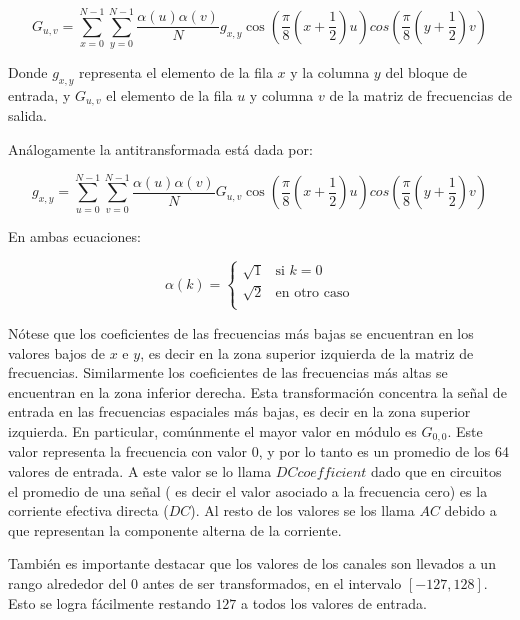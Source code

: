 \documentclass[%
	final,
	reprint,
	notitlepage,
	narroweqnarray,
	inline,
	twoside,
	invited
	]{ieee}
\begin{document}
\begin{equation}
	G_{u, v} = \sum^{N-1}_{x=0}\sum^{N-1}_{y=0}\frac{\alpha(u)\alpha(v)}{N}g_{x, y}\cos(\frac{\pi}{8}(x+\frac{1}{2})u)cos(\frac{\pi}{8}(y+\frac{1}{2})v)
\end{equation}

Donde $g_{x, y}$ representa el elemento de la fila $x$ y la columna $y$ del bloque de entrada, y $G_{u, v}$ 
el elemento de la fila $u$ y columna $v$ de la matriz de frecuencias de salida.

Análogamente la antitransformada está dada por:

\begin{equation}
	g_{x, y} = \sum^{N-1}_{u=0}\sum^{N-1}_{v=0}\frac{\alpha(u)\alpha(v)}{N}G_{u, v}\cos(\frac{\pi}{8}(x+\frac{1}{2})u)cos(\frac{\pi}{8}(y+\frac{1}{2})v)
\end{equation}

En ambas ecuaciones:

\begin{equation}
	\alpha(k) = \left \{
		\begin{array}{rl}
			\sqrt{1} & \mbox{si } k = 0 \\ 
			\sqrt{2} & \mbox{en otro caso} \\
		\end{array}
		\right.
\end{equation}

\par Nótese que los coeficientes de las frecuencias más bajas se encuentran en los valores bajos de $x$ e $y$, 
es decir en la zona superior 
izquierda de la matriz de frecuencias. Similarmente los coeficientes de las frecuencias más altas se encuentran 
en la zona inferior derecha. Esta transformación concentra la señal de entrada en las frecuencias espaciales más bajas, 
es decir en la zona superior izquierda. En particular, comúnmente el mayor valor en módulo es $G_{0,0}$. 
Este valor representa la frecuencia con valor 0, y por lo tanto es un promedio de los 64 valores de entrada. A este 
valor se lo llama $DC coefficient$ dado que en circuitos el promedio de una señal ( es decir el valor asociado 
a la frecuencia cero) es la corriente efectiva directa ($DC$). Al resto de los valores se los llama $AC$ debido 
a que representan la componente alterna de la corriente.

\par También es importante destacar que los valores de los canales son llevados a un rango 
alrededor del $0$ antes de ser transformados, en el intervalo $[-127,128]$. Esto se logra fácilmente restando 
$127$ a todos los valores de entrada.
\end{document}
